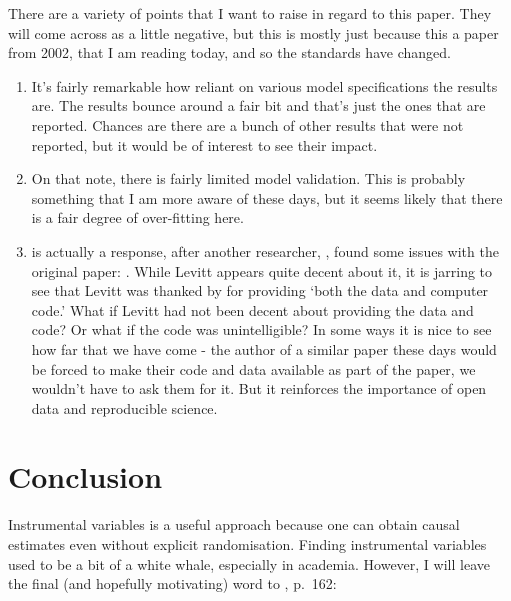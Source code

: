 \documentclass[
]{book}
\providecommand{\tightlist}{%
  \setlength{\itemsep}{0pt}\setlength{\parskip}{0pt}}
\begin{document}
There are a variety of points that I want to raise in regard to this paper. They will come across as a little negative, but this is mostly just because this a paper from 2002, that I am reading today, and so the standards have changed.

\begin{enumerate}
\def\labelenumi{\arabic{enumi}.}
\tightlist
\item
  It's fairly remarkable how reliant on various model specifications the results are. The results bounce around a fair bit and that's just the ones that are reported. Chances are there are a bunch of other results that were not reported, but it would be of interest to see their impact.
\item
  On that note, there is fairly limited model validation. This is probably something that I am more aware of these days, but it seems likely that there is a fair degree of over-fitting here.
\item
  \citet{levitt2002using} is actually a response, after another researcher, \citet{mccrary2002using}, found some issues with the original paper: \citet{levitt87using}. While Levitt appears quite decent about it, it is jarring to see that Levitt was thanked by \citet{mccrary2002using} for providing `both the data and computer code.' What if Levitt had not been decent about providing the data and code? Or what if the code was unintelligible? In some ways it is nice to see how far that we have come - the author of a similar paper these days would be forced to make their code and data available as part of the paper, we wouldn't have to ask them for it. But it reinforces the importance of open data and reproducible science.
\end{enumerate}

\hypertarget{conclusion}{%
\section{Conclusion}\label{conclusion}}

Instrumental variables is a useful approach because one can obtain causal estimates even without explicit randomisation. Finding instrumental variables used to be a bit of a white whale, especially in academia. However, I will leave the final (and hopefully motivating) word to \citet{taddy2019}, p.~162:
\end{document}
